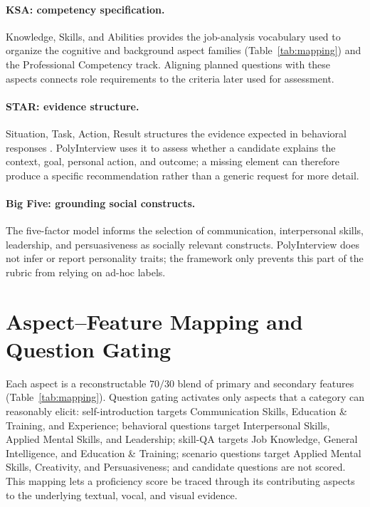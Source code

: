 \documentclass[11pt]{article}
\begin{document}
\paragraph{KSA: competency specification.} Knowledge, Skills, and Abilities provides the job-analysis vocabulary used to organize the cognitive and background aspect families (Table~\ref{tab:mapping}) and the Professional Competency track. Aligning planned questions with these aspects connects role requirements to the criteria later used for assessment.

\paragraph{STAR: evidence structure.} Situation, Task, Action, Result structures the evidence expected in behavioral responses \citep{janz1982behavior}. PolyInterview uses it to assess whether a candidate explains the context, goal, personal action, and outcome; a missing element can therefore produce a specific recommendation rather than a generic request for more detail.

\paragraph{Big Five: grounding social constructs.} The five-factor model \citep{mccrae1987validation} informs the selection of communication, interpersonal skills, leadership, and persuasiveness as socially relevant constructs. PolyInterview does not infer or report personality traits; the framework only prevents this part of the rubric from relying on ad-hoc labels.

\section{Aspect--Feature Mapping and Question Gating}
\label{app:mapping}
Each aspect is a reconstructable $70/30$ blend of primary and secondary features (Table~\ref{tab:mapping}). Question gating activates only aspects that a category can reasonably elicit: self-introduction targets Communication Skills, Education \& Training, and Experience; behavioral questions target Interpersonal Skills, Applied Mental Skills, and Leadership; skill-QA targets Job Knowledge, General Intelligence, and Education \& Training; scenario questions target Applied Mental Skills, Creativity, and Persuasiveness; and candidate questions are not scored. This mapping lets a proficiency score be traced through its contributing aspects to the underlying textual, vocal, and visual evidence.
\end{document}
